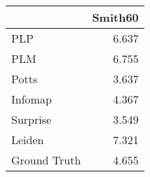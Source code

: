 \begin{tabular}{lr}
\toprule
{} & Smith60 \\
\midrule
PLP          &   6.637 \\
PLM          &   6.755 \\
Potts        &   3.637 \\
Infomap      &   4.367 \\
Surprise     &   3.549 \\
Leiden       &   7.321 \\
Ground Truth &   4.655 \\
\bottomrule
\end{tabular}
